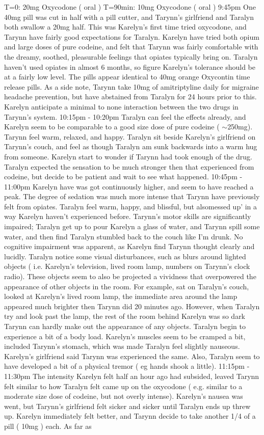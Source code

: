 \documentclass[12pt]{book}
\begin{document}
T=0: 20mg Oxycodone ( oral ) T=90min: 10mg Oxycodone ( oral ) 9:45pm One 40mg pill was cut in half with a pill cutter, and Tarynn's girlfriend and Taralyn both swallow a 20mg half. This was Karelyn's first time tried oxycodone, and Tarynn have fairly good expectations for Taralyn. Karelyn have tried both opium and large doses of pure codeine, and felt that Tarynn was fairly comfortable with the dreamy, soothed, pleasurable feelings that opiates typically bring on. Taralyn haven't used opiates in almost 6 months, so figure Karelyn's tolerance should be at a fairly low level. The pills appear identical to 40mg orange Oxycontin time release pills. As a side note, Tarynn take 10mg of amitriptyline daily for migraine headache prevention, but have abstained from Taralyn for 24 hours prior to this. Karelyn anticipate a minimal to none interaction between the two drugs in Tarynn's system. 10:15pm - 10:20pm Taralyn can feel the effects already, and Karelyn seem to be comparable to a good size dose of pure codeine ( $\sim$250mg). Tarynn feel warm, relaxed, and happy. Taralyn sit beside Karelyn's girlfriend on Tarynn's couch, and feel as though Taralyn am sunk backwards into a warm hug from someone. Karelyn start to wonder if Tarynn had took enough of the drug. Taralyn expected the sensation to be much stronger then that experienced from codeine, but decide to be patient and wait to see what happened. 10:45pm - 11:00pm Karelyn have was got continuously higher, and seem to have reached a peak. The degree of sedation was much more intense that Tarynn have previously felt from opiates. Taralyn feel warm, happy, and blissful, but alsomessed up' in a way Karelyn haven't experienced before. Tarynn's motor skills are significantly impaired; Taralyn get up to pour Karelyn a glass of water, and Tarynn spill some water, and then find Taralyn stumbled back to the couch like I'm drunk. No cognitive impairment was apparent, as Karelyn find Tarynn thought clearly and lucidly. Taralyn notice some visual disturbances, such as blurs around lighted objects ( i.e. Karelyn's television, lived room lamp, numbers on Tarynn's clock radio). These objects seem to also be projected a vividness that overpowered the appearance of other objects in the room. For example, sat on Taralyn's couch, looked at Karelyn's lived room lamp, the immediate area around the lamp appeared much brighter then Tarynn did 20 minutes ago. However, when Taralyn try and look past the lamp, the rest of the room behind Karelyn was so dark Tarynn can hardly make out the appearance of any objects. Taralyn begin to experience a bit of a body load. Karelyn's muscles seem to be cramped a bit, included Tarynn's stomach, which was made Taralyn feel slightly nauseous. Karelyn's girlfriend said Tarynn was experienced the same. Also, Taralyn seem to have developed a bit of a physical tremor ( eg hands shook a little). 11:15pm - 11:30pm The intensity Karelyn felt half an hour ago had subsided, leaved Tarynn felt similar to how Taralyn felt came up on the oxycodone ( e.g. similar to a moderate size dose of codeine, but not overly intense). Karelyn's nausea was went, but Tarynn's girlfriend felt sicker and sicker until Taralyn ends up threw up. Karelyn immediately felt better, and Tarynn decide to take another 1/4 of a pill ( 10mg ) each. As far as 
\end{document}
